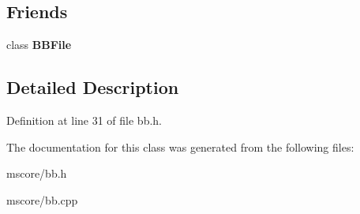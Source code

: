 \subsection*{Friends}
\begin{DoxyCompactItemize}
\item 
\mbox{\label{class_ms_1_1_b_b_track_a45a6ce17e7462a050379a8fa1f22dc94}} 
class {\bfseries B\+B\+File}
\end{DoxyCompactItemize}


\subsection{Detailed Description}


Definition at line 31 of file bb.\+h.



The documentation for this class was generated from the following files\+:\begin{DoxyCompactItemize}
\item 
mscore/bb.\+h\item 
mscore/bb.\+cpp\end{DoxyCompactItemize}
